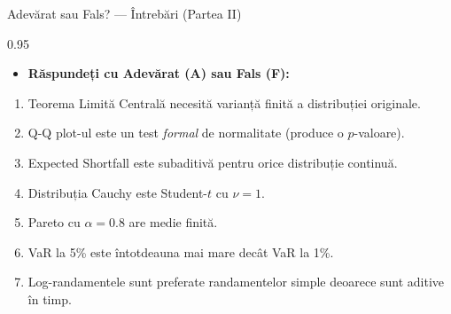 \documentclass[9pt, aspectratio=169, t]{beamer}
\begin{document}
\begin{frame}{Adevărat sau Fals? --- Întrebări (Partea II)}
\begin{cminipage}{0.95\textwidth}
    \begin{itemize}\setlength{\itemsep}{0pt}
        \item \textbf{Răspundeți cu Adevărat (A) sau Fals (F):}
    \end{itemize}
    \vspace{0.3cm}
    \begin{enumerate}\setlength{\itemsep}{0pt}
        \setcounter{enumi}{7}
        \item Teorema Limită Centrală necesită varianță finită a distribuției originale.
        \item Q-Q plot-ul este un test \textit{formal} de normalitate (produce o $p$-valoare).
        \item Expected Shortfall este subaditivă pentru orice distribuție continuă.
        \item Distribuția Cauchy este Student-$t$ cu $\nu = 1$.
        \item Pareto cu $\alpha = 0.8$ are medie finită.
        \item VaR la 5\% este întotdeauna mai mare decât VaR la 1\%.
        \item Log-randamentele sunt preferate randamentelor simple deoarece sunt aditive în timp.
    \end{enumerate}
\end{cminipage}
\end{frame}
\end{document}
